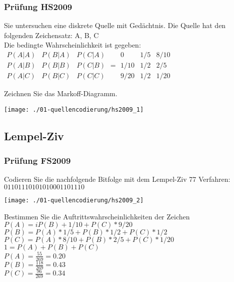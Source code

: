 \subsubsection{Prüfung HS2009}
Sie untersuchen eine diskrete Quelle mit Gedächtnis. Die Quelle hat den folgenden Zeichensatz: A, B, C\\
Die bedingte Wahrscheinlichkeit ist gegeben:\\
$\begin{matrix}
    P(A|A) & P(B|A) & P(C|A)\\
    P(A|B) & P(B|B) & P(C|B)\\
    P(A|C) & P(B|C) & P(C|C)
\end{matrix} = \begin{matrix}
    0 & 1/5 & 8/10\\
    1/10 & 1/2 & 2/5\\
    9/20 & 1/2 & 1/20
\end{matrix}$

Zeichnen Sie das Markoff-Diagramm.
\begin{center}
    \vspace{-8pt}
    \texttt{[image: ./01-quellencodierung/hs2009\_1]}
    \vspace{-8pt}
\end{center}

\columnbreak

\subsection{Lempel-Ziv}
\subsubsection{Prüfung FS2009}
Codieren Sie die nachfolgende Bitfolge mit dem Lempel-Ziv 77 Verfahren:\\
$01101110101010001101110$
\begin{center}
    \vspace{-8pt}
    \texttt{[image: ./01-quellencodierung/hs2009\_2]}
    \vspace{-8pt}
\end{center}

Bestimmen Sie die Auftrittswahrscheinlichkeiten der Zeichen\\
$P(A)=iP(B)+1/10+P(C)*9/20$\\
$P(B)=P(A)*1/5+P(B)*1/2+P(C)*1/2$\\
$P(C)=P(A)*8/10+P(B)*2/5+P(C)*1/20$\\
$1=P(A)+P(B)+P(C)$\\

$P(A)=\frac{55}{269}=0.20$\\
$P(B)=\frac{118}{269}=0.43$\\
$P(C)=\frac{96}{269}=0.34$







